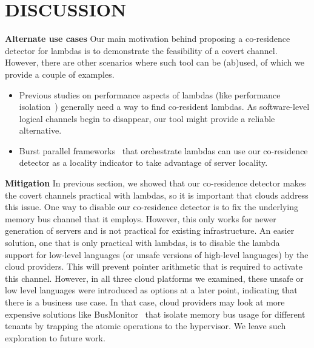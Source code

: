 \section{DISCUSSION}
\label{sec:discussion}
\textbf{Alternate use cases}
Our main motivation behind proposing a co-residence detector for lambdas is
to demonstrate the feasibility of a covert channel. However, there are other
scenarios where such tool can be (ab)used, of which we provide a couple of examples. 
\begin{itemize}
    \item Previous studies on performance aspects of lambdas (like performance 
    isolation~\cite{wangusenix2018}) generally need a way to find co-resident
    lambdas. As software-level logical channels begin to disappear, our tool 
    might provide a reliable alternative.
    \item Burst parallel frameworks~\cite{234886} that orchestrate lambdas can
    use our co-residence detector as a locality indicator to take advantage of
    server locality.
\end{itemize}

\noindent \textbf{Mitigation}
In previous section, we showed that our co-residence detector makes the covert
channels practical with lambdas, so it is important that clouds address this
issue. One way to disable our co-residence detector is to fix the underlying
memory bus channel that it employs. However, this only works for newer
generation of servers and is not practical for existing infrastructure. An
easier solution, one that is only practical with lambdas, is to disable the
lambda support for low-level languages (or unsafe versions of high-level
languages) by the cloud providers. This will prevent pointer arithmetic that is
required to activate this channel. However, in all three cloud platforms we examined, 
these unsafe or low level languages were introduced as options at a later point, 
indicating that there is a business use case. In that case, cloud providers may look at
more expensive solutions like BusMonitor~\cite{MemoryBusMitigation} that isolate
memory bus usage for different tenants by trapping the atomic operations to the 
hypervisor. We leave such exploration to future work.
